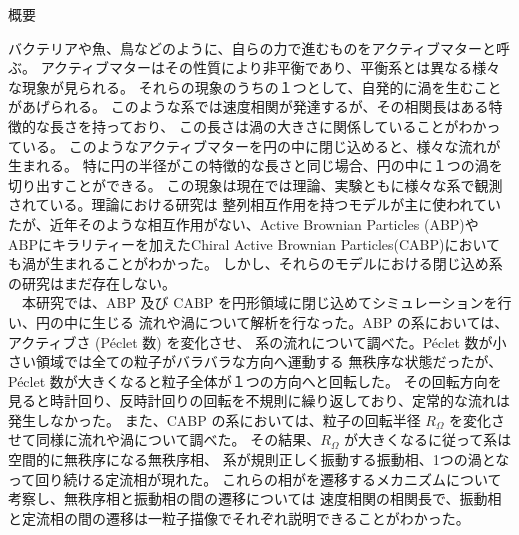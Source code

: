 \documentclass[/Users/ikedahajime/GitHub/reserch/master_report/thesis]{subfiles}
\begin{document}
\begin{center}
\Large{概要}
\end{center}
\normalsize
\thispagestyle{empty}
バクテリアや魚、鳥などのように、自らの力で進むものをアクティブマターと呼ぶ。
アクティブマターはその性質により非平衡であり、平衡系とは異なる様々な現象が見られる。
それらの現象のうちの１つとして、自発的に渦を生むことがあげられる。
このような系では速度相関が発達するが、その相関長はある特徴的な長さを持っており、
この長さは渦の大きさに関係していることがわかっている。
このようなアクティブマターを円の中に閉じ込めると、様々な流れが生まれる。
特に円の半径がこの特徴的な長さと同じ場合、円の中に１つの渦を切り出すことができる。
この現象は現在では理論、実験ともに様々な系で観測されている。理論における研究は
整列相互作用を持つモデルが主に使われていたが、近年そのような相互作用がない、Active Brownian Particles (ABP)や
ABPにキラリティーを加えたChiral Active Brownian Particles(CABP)においても渦が生まれることがわかった\cite{szamelLongrangedVelocityCorrelations2021,szamelLongrangedVelocityCorrelations2021,kurodaAnomalousFluctuationsHomogeneous2023,kurodaLongrangeTranslationalOrder2024}。
しかし、それらのモデルにおける閉じ込め系の研究はまだ存在しない。\\
　本研究では、ABP 及び CABP を円形領域に閉じ込めてシミュレーションを行い、円の中に生じる
流れや渦について解析を行なった。ABP の系においては、アクティブさ (Péclet 数) を変化させ、
系の流れについて調べた。Péclet 数が小さい領域では全ての粒子がバラバラな方向へ運動する
無秩序な状態だったが、Péclet 数が大きくなると粒子全体が１つの方向へと回転した。
その回転方向を見ると時計回り、反時計回りの回転を不規則に繰り返しており、定常的な流れは発生しなかった。
また、CABP の系においては、粒子の回転半径 $R_\Omega$ を変化させて同様に流れや渦について調べた。
その結果、$R_\Omega$ が大きくなるに従って系は空間的に無秩序になる無秩序相、
系が規則正しく振動する振動相、1つの渦となって回り続ける定流相が現れた。
これらの相がを遷移するメカニズムについて考察し、無秩序相と振動相の間の遷移については
速度相関の相関長で、振動相と定流相の間の遷移は一粒子描像でそれぞれ説明できることがわかった。
\end{document}
